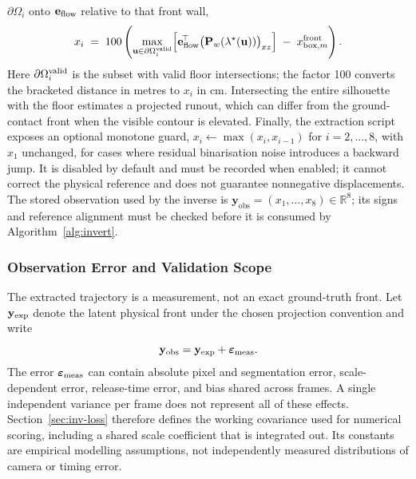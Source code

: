 $\partial\Omega_{i}$ onto $\mathbf{e}_{\rm flow}$ relative to that front wall,
\begin{equation}
\label{eq:xi}
    x_{i} \;=\;
    100\left(\max_{\mathbf{u} \in \partial\Omega_{i}^{\rm valid}}
    \Bigl[\mathbf{e}_{\rm flow}^{\!\top}
          \bigl(\mathbf{P}_{w}(\lambda^{\star}(\mathbf{u}))\bigr)_{xz}\Bigr]
    \;-\; x^{\mathrm{front}}_{\mathrm{box},m}\right).
\end{equation}
Here $\partial\Omega_i^{\rm valid}$ is the subset with valid floor
intersections; the factor 100 converts the bracketed distance in metres
to $x_i$ in cm. Intersecting the entire silhouette with the floor estimates
a projected runout, which can differ from the ground-contact front when
the visible contour is elevated.
Finally, the extraction script exposes an optional monotone guard,
$x_i\leftarrow\max(x_i,x_{i-1})$ for $i=2,\ldots,8$, with $x_1$ unchanged, for cases where residual
binarisation noise introduces a backward jump. It is disabled by default
and must be recorded when enabled; it cannot correct the physical
reference and does not guarantee nonnegative displacements. The stored observation
used by the inverse is
$\mathbf{y}_{\mathrm{obs}} = (x_{1}, \dots, x_{8})
\in \mathbb{R}^{8}$; its signs and reference alignment must be checked before it is consumed by
Algorithm~\ref{alg:invert}.

\subsubsection{Observation Error and Validation Scope}
The extracted trajectory is a measurement, not an exact ground-truth
front. Let $\mathbf y_{\rm exp}$ denote the latent physical front
under the chosen projection convention and write
\begin{equation}
\label{eq:observation-error}
 \mathbf y_{\rm obs}=\mathbf y_{\rm exp}
                      +\boldsymbol\varepsilon_{\rm meas}.
\end{equation}
The error $\boldsymbol\varepsilon_{\rm meas}$ can contain absolute pixel
and segmentation error, scale-dependent error, release-time error,
and bias shared across frames. A single independent variance per frame
does not represent all of these effects. Section~\ref{sec:inv-loss}
therefore defines the working covariance used for numerical scoring,
including a shared scale coefficient that is integrated out. Its
constants are empirical modelling assumptions, not independently
measured distributions of camera or timing error.


